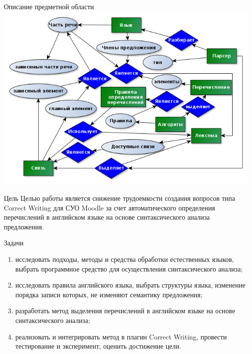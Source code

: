 \documentclass[10pt,ps,serif,mathserif]{beamer}
\begin{document}
    \begin{frame}{Описание предметной области}
        \includegraphics[width=\textwidth]{images/erd.png}
    \end{frame}
    \begin{frame}{Цель}
        \Large Целью работы является снижение трудоемкости создания вопросов типа Correct Writing для
        СУО Moodle за счет автоматического определения перечислений в английском языке на основе синтаксического
        анализа предложения.
    \end{frame}
    \begin{frame}{Задачи}
        \large
       \begin{enumerate}
        \item исследовать подходы, методы и средства обработки естественных языков,
                выбрать программное средство для осуществления синтаксического анализа;
        \item исследовать правила английского языка, выбрать структуры языка, изменение порядка записи
            которых, не изменяют семантику предложения;
        \item разработать метод выделения перечислений в английском языке на основе синтаксического
            анализа;
        \item реализовать и интегрировать метод в плагин Correct Writing, провести тестирование и
            эксперимент, оценить достижение цели.
       \end{enumerate}
    \end{frame}
\end{document}
